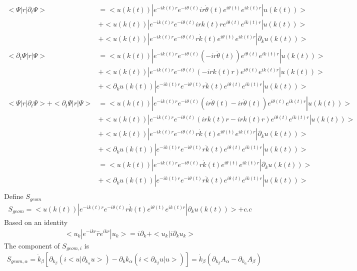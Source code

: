 \documentclass[a4paper]{article}
\begin{document}
\begin{align*}
<\Psi|r|\partial_t\Psi> &= <u(k(t))|e^{-ik(t)r}e^{-i\theta(t)} i r \dot \theta(t) e^{i\theta(t)} e^{ik(t)r}|u(k(t))>  \\
                                &+ <u(k(t))|e^{-ik(t)r}e^{-i\theta(t)} i r k(t)r e^{i\theta(t)} e^{ik(t)r}|u(k(t))>\\
                                &+ <u(k(t))|e^{-ik(t)r}e^{-i\theta(t)} r \dot k(t) e^{i\theta(t)} e^{ik(t)r}|\partial_k u(k(t))>\\
<\partial_t \Psi|r|\Psi> & =  <u(k(t))|e^{-ik(t)r}e^{-i\theta(t)}(-ir  \dot \theta(t)) e^{i\theta(t)} e^{ik(t)r}|u(k(t))> \\
                                 &  + <u(k(t))|e^{-ik(t)r}e^{-i\theta(t)} (-i r k(t)r) e^{i\theta(t)} e^{ik(t)r}|u(k(t))> \\
                                 & + <\partial_k u(k(t))|e^{-ik(t)r}e^{-i\theta(t)} r \dot k(t) e^{i\theta(t)} e^{ik(t)r}|u(k(t))>\\
<\Psi|r|\partial_t\Psi> + <\partial_t \Psi|r|\Psi>
& =<u(k(t))|e^{-ik(t)r}e^{-i\theta(t)}( i r \dot \theta(t) -ir  \dot \theta(t)) e^{i\theta(t)} e^{ik(t)r}|u(k(t))>\\
& +  <u(k(t))|e^{-ik(t)r}e^{-i\theta(t)} (i r k(t)r -i r k(t)r)  e^{i\theta(t)} e^{ik(t)r}|u(k(t))>\\
& + <u(k(t))|e^{-ik(t)r}e^{-i\theta(t)} r \dot k(t) e^{i\theta(t)} e^{ik(t)r}|\partial_k u(k(t))>\\
& + <\partial_k u(k(t))|e^{-ik(t)r}e^{-i\theta(t)} r \dot k(t) e^{i\theta(t)} e^{ik(t)r}|u(k(t))> \\
& = <u(k(t))|e^{-ik(t)r}e^{-i\theta(t)} r \dot k(t) e^{i\theta(t)} e^{ik(t)r}|\partial_k u(k(t))>\\
 & + <\partial_k u(k(t))|e^{-ik(t)r}e^{-i\theta(t)} r \dot k(t) e^{i\theta(t)} e^{ik(t)r}|u(k(t))>\\
\end{align*}
Define $S_{geom}$
\begin{align*}
S_{geom} = <u(k(t))|e^{-ik(t)r}e^{-i\theta(t)} r \dot k(t) e^{i\theta(t)} e^{ik(t)r}|\partial_k u(k(t))> + c.c
\end{align*}
Based on an identity
\begin{align*}
<u_k|e^{-ikr} \hat r e^{ikr}| u_k> = i \partial_k + <u_k| i\partial_k u_k>
\end{align*}
The component of $S_{geom,i}$ is
\begin{align*}
S_{geom, \alpha} = \dot k_{\beta} [\partial_{k_{\beta}}(i<u|\partial_{k_{\alpha}}u>) - \partial_k{k_\alpha}(i<\partial_{k_{\beta}}u|u> )]
= \dot k_{\beta} (\partial_{k_{\beta}} A_{\alpha} - \partial_{k_{\alpha}}A_{\beta})
\end{align*}
\end{document}
